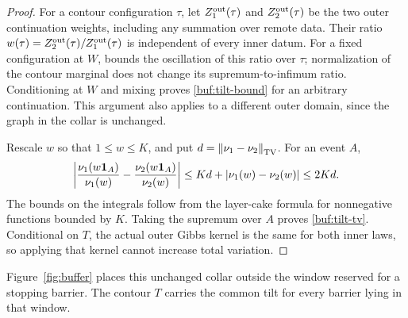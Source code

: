\begin{proof}
For a contour configuration $\tau$, let $Z_1^{\rm out}(\tau)$ and
$Z_2^{\rm out}(\tau)$ be the two outer continuation weights, including
any summation over remote data.  Their ratio
$w(\tau)=Z_2^{\rm out}(\tau)/Z_1^{\rm out}(\tau)$ is independent of
every inner datum.  For a fixed configuration
at $W$,  bounds the oscillation of this ratio over
$\tau$; normalization of the contour marginal does not change its
supremum-to-infimum ratio.  Conditioning at $W$ and mixing proves
\eqref{buf:tilt-bound} for an arbitrary continuation.  This argument
also applies to a different outer domain, since the graph in the
collar is unchanged.

Rescale $w$ so that $1\le w\le K$, and put
$d=\left\|\nu_1-\nu_2\right\|_{\operatorname{TV}}$.  For an event $A$,
\[
 \left|\frac{\nu_1(w\mathbf 1_A)}{\nu_1(w)}
       -\frac{\nu_2(w\mathbf 1_A)}{\nu_2(w)}\right|
 \le Kd+|\nu_1(w)-\nu_2(w)|\le 2Kd.
\]
The bounds on the integrals follow from the layer-cake formula for
nonnegative functions bounded by $K$.  Taking the supremum over $A$
proves \eqref{buf:tilt-tv}.  Conditional on $T$, the actual outer Gibbs
kernel is the same for both inner laws, so applying that kernel cannot
increase total variation.
\end{proof}

Figure~\ref{fig:buffer} places this unchanged collar outside the
window reserved for a stopping barrier.  The contour $T$ carries the
common tilt for every barrier lying in that window.


